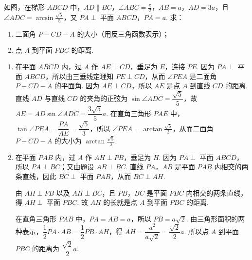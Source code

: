 \begin{problem}
如图，在梯形 \(ABCD\) 中，\(AD \parallel BC\)，\(\angle ABC = \frac{\pi}{2}\)，\(AB = a\)，\(AD = 3a\)，且 \(\angle ADC = \arcsin \frac{\sqrt{5}}{5}\)，又 \(PA \perp\) 平面 \(ABCD\)，\(PA = a\). 求：

\begin{enumerate}
\item 二面角 \(P - CD - A\) 的大小（用反三角函数表示）；
\item 点 \(A\) 到平面 \(PBC\) 的距离.
\end{enumerate}

\end{problem}

\begin{solution}
\begin{enumerate}
\item 在平面 \(ABCD\) 内，过 \(A\) 作 \(AE \perp CD\)，垂足为 \(E\)，连接 \(PE\).
因为 \(PA \perp\) 平面 \(ABCD\)，所以由三垂线定理知 \(PE \perp CD\)，从而 \(\angle PEA\) 是二面角 \(P - CD - A\) 的平面角.
因为 \(AE\perp CD\)，所以 \(AE\) 是点 \(A\) 到直线 \(CD\) 的距离. 直线 \(AD\) 与直线 \(CD\) 的夹角的正弦为 \(\sin\angle ADC=\dfrac{\sqrt5}{5}\)，故 \(AE=AD\sin\angle ADC=\dfrac{3\sqrt5}{5}a\).
在直角三角形 \(PAE\) 中，\(\tan \angle PEA = \dfrac{PA}{AE} = \dfrac{\sqrt{5}}{3}\)，所以 \(\angle PEA = \arctan \frac{\sqrt{5}}{3}\)，从而二面角 \(P - CD - A\) 的大小为 \(\arctan \frac{\sqrt{5}}{3}\).

\item 在平面 \(PAB\) 内，过 \(A\) 作 \(AH \perp PB\)，垂足为 \(H\).
因为 \(PA \perp\) 平面 \(ABCD\)，所以 \(PA \perp BC\)；又由题设 \(AB \perp BC\). 直线 \(PA\)，\(AB\) 是平面 \(PAB\) 内相交的两条直线，因此 \(BC \perp\) 平面 \(PAB\)，从而 \(BC \perp AH\).

由 \(AH \perp PB\) 以及 \(AH \perp BC\)，且 \(PB\)，\(BC\) 是平面 \(PBC\) 内相交的两条直线，得 \(AH \perp\) 平面 \(PBC\). 故 \(AH\) 的长就是点 \(A\) 到平面 \(PBC\) 的距离.

在直角三角形 \(PAB\) 中，\(PA=AB=a\)，所以 \(PB=a\sqrt2\). 由三角形面积的两种表示，\(\dfrac12 PA\cdot AB=\dfrac12 PB\cdot AH\)，得 \(AH=\dfrac{a^2}{a\sqrt2}=\dfrac{\sqrt2}{2}a\). 所以点 \(A\) 到平面 \(PBC\) 的距离为 \(\dfrac{\sqrt2}{2}a\).
\end{enumerate}
\end{solution}

